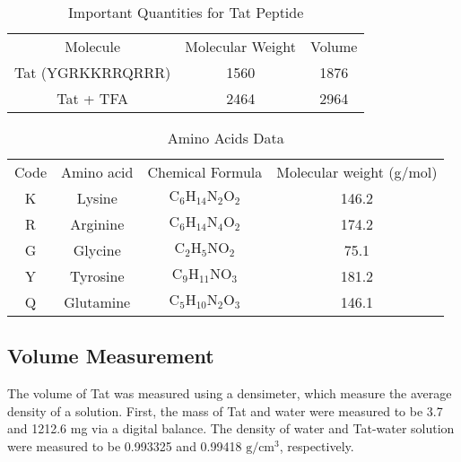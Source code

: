 \documentclass[letterpaper,12pt]{article}
\begin{document}
\begin{table}[ht]
  \centering
  \begin{tabular}{c c c}
    Molecule & Molecular Weight & Volume \\
    Tat (YGRKKRRQRRR) & 1560 & 1876 \\ 
    Tat + TFA & 2464 & 2964
  \end{tabular}
  \caption{Important Quantities for Tat Peptide}
  \label{tb:Tat}
\end{table}

\begin{table}[ht]
  \centering
  \begin{tabular}{c c c c}
    Code & Amino acid & Chemical Formula & Molecular weight (g/mol) \\
    K & Lysine & $\mathrm{C_6H_{14}N_2O_2}$ & 146.2 \\
    R & Arginine & $\mathrm{C_6H_{14}N_4O_2}$ & 174.2 \\
    G & Glycine & $\mathrm{C_2H_5NO_2}$ & 75.1\\
    Y & Tyrosine & $\mathrm{C_9H_{11}NO_3}$ & 181.2 \\
    Q & Glutamine & $\mathrm{C_5H_{10}N_2O_3}$ & 146.1  
  \end{tabular}
  \caption{Amino Acids Data}
  \label{tb:aa}
\end{table}

\subsection{Volume Measurement}
The volume of Tat was measured using a densimeter, which measure the average 
density of a solution. First, the mass of Tat and water were measured to be 
3.7 and 1212.6 mg via a digital balance. The density of water and 
Tat-water solution were measured to be 0.993325 and 0.99418 $\mathrm{g/cm^3}$,
respectively.
\end{document}
